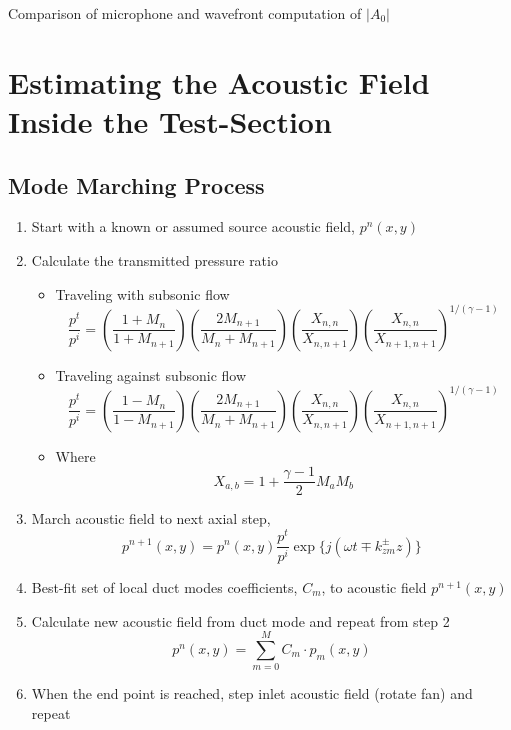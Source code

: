 \begin{table}
\centering
\caption{Comparison of microphone and wavefront computation of $|A_0|$}

\label{tab:03_speherical_measurement}
\end{table}



\section{Estimating the Acoustic Field Inside the Test-Section}



\subsection{Mode Marching Process}
\begin{enumerate}
  \item Start with a known or assumed source acoustic field, $p^n(x,y)$

  \item Calculate the transmitted pressure ratio
  \begin{itemize}
    \item Traveling with subsonic flow
      \begin{equation}
        \frac{p^t}{p^i} = \left(\frac{1+M_n}{1+M_{n+1}}\right)\left(\frac{2M_{n+1}}{M_n+M_{n+1}}\right)\left(\frac{X_{n,n}}{X_{n,n+1}}\right)\left(\frac{X_{n,n}}{X_{n+1,n+1}}\right)^{1/(\gamma-1)}
      \end{equation}
    \item Traveling against subsonic flow
      \begin{equation}
        \frac{p^t}{p^i} = \left(\frac{1-M_n}{1-M_{n+1}}\right)\left(\frac{2M_{n+1}}{M_n+M_{n+1}}\right)\left(\frac{X_{n,n}}{X_{n,n+1}}\right)\left(\frac{X_{n,n}}{X_{n+1,n+1}}\right)^{1/(\gamma-1)}
      \end{equation}
    \item Where
      \begin{equation}
        X_{a,b} = 1+\frac{\gamma-1}{2}M_aM_b
      \end{equation}
  \end{itemize}

  \item March acoustic field to next axial step,
    \begin{equation}
      p^{n+1}(x,y) = p^{n}(x,y)\frac{p^t}{p^i}\exp\{j(\omega t\mp k_{zm}^\pm z)\}
    \end{equation}

  \item Best-fit set of local duct modes coefficients, $C_m$, to acoustic field $p^{n+1}(x,y)$

  \item Calculate new acoustic field from duct mode and repeat from step 2
    \begin{equation}
      p^n(x,y) = \sum_{m=0}^{M} C_m\cdot p_m(x,y)
    \end{equation}

  \item When the end point is reached, step inlet acoustic field (rotate fan) and repeat
\end{enumerate}
